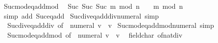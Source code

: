 \begin{isabellebody}
\endisatagproof
{\isafoldproof}%
%
\isadelimproof
\isanewline
%
\endisadelimproof
\isanewline
{}\isamarkupfalse%
\ Suc{\isacharunderscore}{\kern0pt}mod{\isacharunderscore}{\kern0pt}eq{\isacharunderscore}{\kern0pt}add{}{\isacharunderscore}{\kern0pt}mod{\isacharcolon}{\kern0pt}\isanewline
\ \ {\isachardoublequoteopen}Suc\ {\isacharparenleft}{\kern0pt}Suc\ {\isacharparenleft}{\kern0pt}Suc\ m{\isacharparenright}{\kern0pt}{\isacharparenright}{\kern0pt}\ mod\ n\ {\isacharequal}{\kern0pt}\ {\isacharparenleft}{\kern0pt}{}\ {\isacharplus}{\kern0pt}\ m{\isacharparenright}{\kern0pt}\ mod\ n{\isachardoublequoteclose}\isanewline
%
\isadelimproof
\ \ %
\endisadelimproof
%
\isatagproof
{}\isamarkupfalse%
\ {\isacharparenleft}{\kern0pt}simp\ add{\isacharcolon}{\kern0pt}\ Suc{}{\isacharunderscore}{\kern0pt}eq{\isacharunderscore}{\kern0pt}add{\isacharunderscore}{\kern0pt}{}{\isacharparenright}{\kern0pt}%
\endisatagproof
{\isafoldproof}%
%
\isadelimproof
\isanewline
%
\endisadelimproof
\isanewline
{}\isamarkupfalse%
\ Suc{\isacharunderscore}{\kern0pt}div{\isacharunderscore}{\kern0pt}eq{\isacharunderscore}{\kern0pt}add{}{\isacharunderscore}{\kern0pt}div{\isacharunderscore}{\kern0pt}numeral\ {\isacharbrackleft}{\kern0pt}simp{\isacharbrackright}{\kern0pt}\ {\isacharequal}{\kern0pt}\isanewline
\ \ Suc{\isacharunderscore}{\kern0pt}div{\isacharunderscore}{\kern0pt}eq{\isacharunderscore}{\kern0pt}add{}{\isacharunderscore}{\kern0pt}div\ {\isacharbrackleft}{\kern0pt}of\ {\isacharunderscore}{\kern0pt}\ {\isachardoublequoteopen}numeral\ v{\isachardoublequoteclose}{\isacharbrackright}{\kern0pt}\ \ v\isanewline
\isanewline
{}\isamarkupfalse%
\ Suc{\isacharunderscore}{\kern0pt}mod{\isacharunderscore}{\kern0pt}eq{\isacharunderscore}{\kern0pt}add{}{\isacharunderscore}{\kern0pt}mod{\isacharunderscore}{\kern0pt}numeral\ {\isacharbrackleft}{\kern0pt}simp{\isacharbrackright}{\kern0pt}\ {\isacharequal}{\kern0pt}\isanewline
\ \ Suc{\isacharunderscore}{\kern0pt}mod{\isacharunderscore}{\kern0pt}eq{\isacharunderscore}{\kern0pt}add{}{\isacharunderscore}{\kern0pt}mod\ {\isacharbrackleft}{\kern0pt}of\ {\isacharunderscore}{\kern0pt}\ {\isachardoublequoteopen}numeral\ v{\isachardoublequoteclose}{\isacharbrackright}{\kern0pt}\ \ v\isanewline
\isanewline
{}\isamarkupfalse%
\ {\isacharparenleft}{\kern0pt}\ field{\isacharunderscore}{\kern0pt}char{\isacharunderscore}{\kern0pt}{}{\isacharparenright}{\kern0pt}\ of{\isacharunderscore}{\kern0pt}nat{\isacharunderscore}{\kern0pt}div{\isacharcolon}{\kern0pt}\isanewline

\end{isabellebody}
